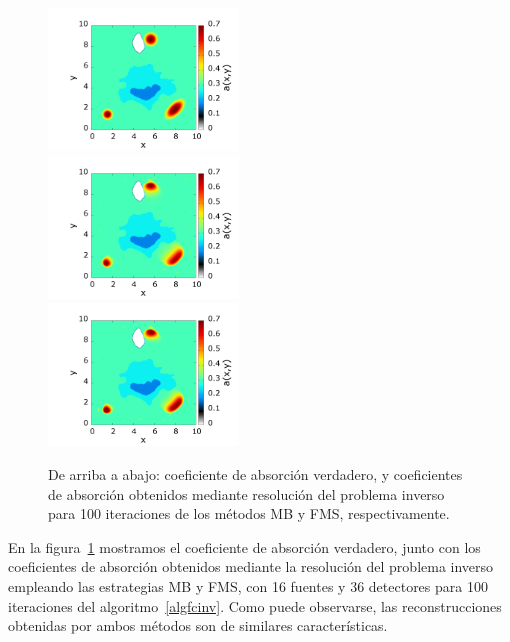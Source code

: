 \pagebreak
\begin{figure}
\centering
  \includegraphics[width=0.45\textwidth]{figuras/necktrue.png}\\

  \includegraphics[width=0.45\textwidth]{figuras/necksweep.png}\\

  \includegraphics[width=0.45\textwidth]{figuras/neckmss.png}
  \caption{De arriba a abajo: coeficiente de absorción verdadero, y
  coeficientes de absorción obtenidos mediante resolución del problema inverso para 100 iteraciones de los métodos MB y FMS, respectivamente.}
 \label{fig:reconst}
\end{figure}
En la figura~\ref{fig:reconst} mostramos el coeficiente de absorción verdadero, 
junto con los coeficientes de absorción obtenidos mediante la resolución del problema 
inverso empleando las estrategias MB y FMS, con 16 fuentes y 36 detectores 
para 100 iteraciones del algoritmo~\ref{algfcinv}. Como puede observarse, 
las reconstrucciones obtenidas por ambos métodos son de similares características. 

